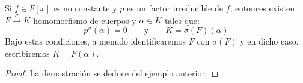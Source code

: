 \begin{lema}\label{lema:cuerpo_descomposicion}
    Si $f\in F[x]$ es no constante y $p$ es un factor irreducible de $f$, entonces existen $F\stackrel{\sigma}{\to}K$ homomorfismo de cuerpos y $\alpha\in K$ tales que:
    \begin{equation*}
        p^\sigma(\alpha) = 0 \qquad \text{y}\qquad  K = \sigma(F)(\alpha)
    \end{equation*}
    Bajo estas condiciones, a menudo identificaremos $F$ con $\sigma(F)$ y en dicho caso, escribiremos $K= F(\alpha)$.
    \begin{proof}
        La demostración se deduce del ejemplo anterior.
    \end{proof}
\end{lema}

